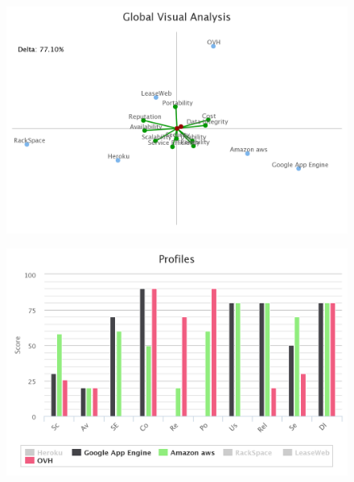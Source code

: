 \documentclass[a4paper,11pt]{article}
\begin{document}
\begin{figure}[h]
  \includegraphics[width=\textwidth]{img/Result/gaia_plane.png}
\end{figure}

\begin{figure}[h]
  \includegraphics[width=\textwidth]{img/Result/profiles-3best.png}
\end{figure}
\end{document}
